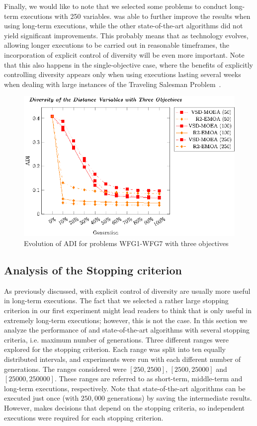 Finally, we would like to note that we selected some problems to conduct long-term executions with 250 variables.
%
\VSDMOEA{} was able to further improve the results when using long-term executions, while the other state-of-the-art algorithms did not yield significant improvements.
%
This probably means that as technology evolves, allowing longer executions to be carried out in reasonable timeframes,
the incorporation of explicit control of diversity will be even more important.
%
Note that this also happens in the single-objective case, where the benefits of explicitly controlling diversity appears only when using executions lasting
several weeks when dealing with large instances of the Traveling Salesman Problem~\cite{segura2015novel}.
%

\begin{figure}[t]
\centering
\includegraphics[scale=0.85]{Images/Graphic-Diversity_3obj_tikz-figure1.eps}
\caption{Evolution of ADI for problems WFG1-WFG7 with three objectives}\label{fig:Diversity_3obj}
\end{figure}

\subsection{Analysis of the Stopping criterion}

As previously discussed, \EAS{} with explicit control of diversity are usually more useful in long-term executions.
%
The fact that we selected a rather large stopping criterion in our first experiment might lead readers to think that \VSDMOEA{} is only
useful in extremely long-term executions;
%
however, this is not the case.
%
In this section we analyze the performance of \VSDMOEA{} and state-of-the-art algorithms with several stopping criteria, 
i.e. maximum number of generations.
%
Three different ranges were explored for the stopping criterion.
%
Each range was split into ten equally distributed intervals, and experiments were run with each different number of generations.
%
The ranges considered were $[250, 2500]$, $[2500, 25000]$ and $[25000, 250000]$.
%
These ranges are referred to as short-term, middle-term and long-term executions, respectively.
%
Note that state-of-the-art algorithms can be executed just once (with $250,000$ generations) by saving the intermediate results.
%
However, \VSDMOEA{} makes decisions that depend on the stopping criteria, so independent executions were required for each stopping criterion.

